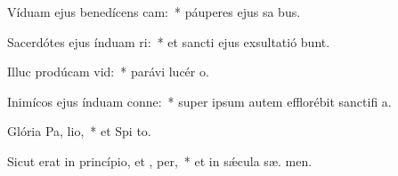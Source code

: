 \item Víduam ejus benedícens cam:~* páuperes ejus sa bus.
\item Sacerdótes ejus índuam ri:~* et sancti ejus exsultatió bunt.
\item Illuc prodúcam  vid:~* parávi lucér  o.
\item Inimícos ejus índuam conne:~* super ipsum autem efflorébit sanctifi a.
\item Glória Pa,  lio,~* et Spi to.
\item Sicut erat in princípio, et ,  per,~* et in sǽcula sæ. men.
